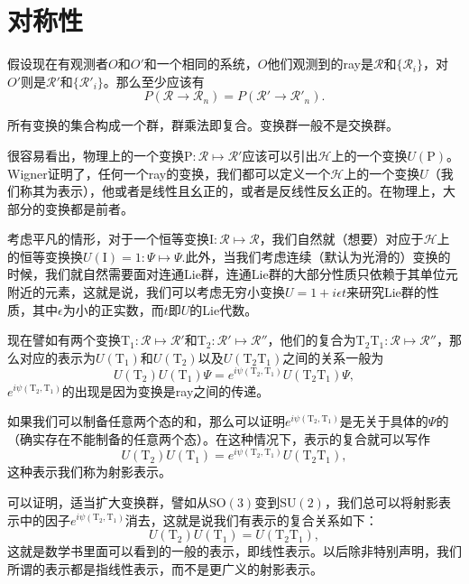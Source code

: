 \documentclass[9pt]{extbook}
\begin{document}
\section{对称性}

假设现在有观测者$O$和$O'$和一个相同的系统，$O$他们观测到的ray是$\mathscr{R}$和$\{\mathscr{R}_i\}$，对$O'$则是$\mathscr{R}'$和$\{\mathscr{R}'_i\}$。那么至少应该有
\[
P(\mathscr{R}\to\mathscr{R}_n)=P(\mathscr{R}'\to\mathscr{R}'_n).
\]

所有变换的集合构成一个群，群乘法即复合。变换群一般不是交换群。

很容易看出，物理上的一个变换$\mathrm{P}:\mathscr{R} \mapsto \mathscr{R}'$应该可以引出$\mathcal{H}$上的一个变换$U(\mathrm{P})$。Wigner证明了，任何一个ray的变换，我们都可以定义一个$\mathcal{H}$上的一个变换$U$（我们称其为表示），他或者是线性且幺正的，或者是反线性反幺正的。在物理上，大部分的变换都是前者。

考虑平凡的情形，对于一个恒等变换$\mathrm{I}:\mathscr{R} \mapsto \mathscr{R}$，我们自然就（想要）对应于$\mathcal{H}$上的恒等变换换$U(\mathrm{I})=1:\Psi\mapsto \Psi$.此外，当我们考虑连续（默认为光滑的）变换的时候，我们就自然需要面对连通Lie群，连通Lie群的大部分性质只依赖于其单位元附近的元素，这就是说，我们可以考虑无穷小变换$U=1+i\epsilon t$来研究Lie群的性质，其中$\epsilon$为小的正实数，而$t$即$U$的Lie代数。

现在譬如有两个变换$\mathrm{T}_1:\mathscr{R}\mapsto \mathscr{R}'$和$\mathrm{T}_2:\mathscr{R}'\mapsto \mathscr{R}''$，他们的复合为$\mathrm{T}_2\mathrm{T}_1:\mathscr{R}\mapsto \mathscr{R}''$，那么对应的表示为$U(\mathrm{T}_1)$和$U(\mathrm{T}_2)$以及$U(\mathrm{T}_2\mathrm{T}_1)$之间的关系一般为
\[
U(\mathrm{T}_2)U(\mathrm{T}_1)\Psi=e^{i\psi(\mathrm{T}_2,\mathrm{T}_1)}U(\mathrm{T}_2\mathrm{T}_1)\Psi,
\]
$e^{i\psi(\mathrm{T}_2,\mathrm{T}_1)}$的出现是因为变换是ray之间的传递。

如果我们可以制备任意两个态的和，那么可以证明$e^{i\psi(\mathrm{T}_2,\mathrm{T}_1)}$是无关于具体的$\Psi$的（确实存在不能制备的任意两个态）。在这种情况下，表示的复合就可以写作
\[
U(\mathrm{T}_2)U(\mathrm{T}_1)=e^{i\psi(\mathrm{T}_2,\mathrm{T}_1)}U(\mathrm{T}_2\mathrm{T}_1),
\]
这种表示我们称为射影表示。

可以证明，适当扩大变换群，譬如从$\mathrm{SO}(3)$变到$\mathrm{SU}(2)$，我们总可以将射影表示中的因子$e^{i\psi(\mathrm{T}_2,\mathrm{T}_1)}$消去，这就是说我们有表示的复合关系如下：
\[
U(\mathrm{T}_2)U(\mathrm{T}_1)=U(\mathrm{T}_2\mathrm{T}_1),
\]
这就是数学书里面可以看到的一般的表示，即线性表示。以后除非特别声明，我们所谓的表示都是指线性表示，而不是更广义的射影表示。
\end{document}
